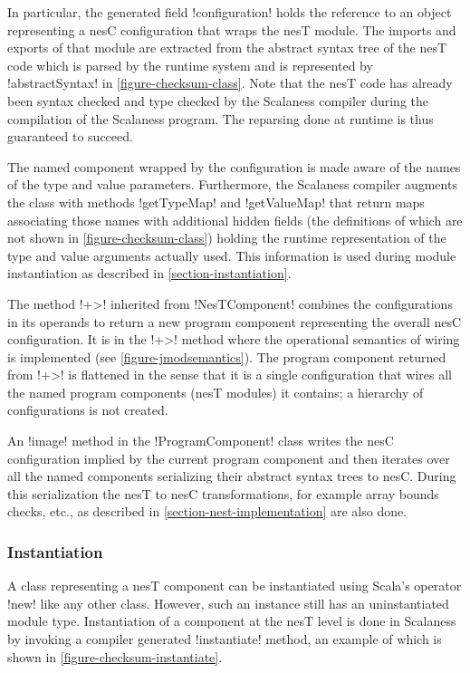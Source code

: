 In particular, the generated field !configuration! holds the reference to an object representing
a nesC configuration that wraps the nesT module. The imports and exports of that module are
extracted from the abstract syntax tree of the nesT code which is parsed by the runtime system
and is represented by !abstractSyntax! in \autoref{figure-checksum-class}. Note that the nesT
code has already been syntax checked and type checked by the Scalaness compiler during the
compilation of the Scalaness program. The reparsing done at runtime is thus guaranteed to
succeed.

The named component wrapped by the configuration is made aware of the names of the type and
value parameters. Furthermore, the Scalaness compiler augments the class with methods
!getTypeMap! and !getValueMap! that return maps associating those names with additional hidden
fields (the definitions of which are not shown in \autoref{figure-checksum-class}) holding the
runtime representation of the type and value arguments actually used. This information is used
during module instantiation as described in \autoref{section-instantiation}.

The method !+>! inherited from !NesTComponent! combines the configurations in its operands to
return a new program component representing the overall nesC configuration. It is in the !+>!
method where the operational semantics of wiring is implemented (see
\autoref{figure-jmodsemantics}). The program component returned from !+>! is flattened in the
sense that it is a single configuration that wires all the named program components (nesT
modules) it contains; a hierarchy of configurations is not created.

An !image! method in the !ProgramComponent! class writes the nesC configuration implied by the
current program component and then iterates over all the named components serializing their
abstract syntax trees to nesC. During this serialization the nesT to nesC transformations, for
example array bounds checks, etc., as described in \autoref{section-nest-implementation} are
also done.

\subsubsection{Instantiation}
\label{section-instantiation}

A class representing a nesT component can be instantiated using Scala's operator !new! like any
other class. However, such an instance still has an uninstantiated module type. Instantiation of
a component at the nesT level is done in Scalaness by invoking a compiler generated
!instantiate! method, an example of which is shown in \autoref{figure-checksum-instantiate}.

